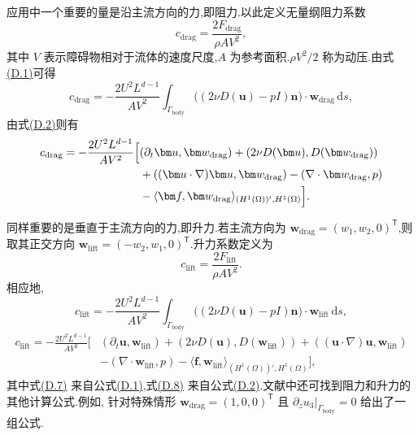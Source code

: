 \begin{note}[流动作用于物体的力]
应用中一个重要的量是沿主流方向的力,即阻力.以此定义无量纲阻力系数
\begin{equation}\label{eq:appendix-d-3}
 c_{\mathrm{drag}}=\frac{2F_{\mathrm{drag}}}{\rho A V^2},
\end{equation}
其中 $V$ 表示障碍物相对于流体的速度尺度,$A$ 为参考面积.$\rho V^2/2$ 称为动压.由式\hyperref[eq:appendix-d-1]{(D.1)}可得
\begin{equation}\label{eq:appendix-d-4}
c_{\mathrm{drag}}
=-\frac{2U^2L^{d-1}}{AV^2}
\int_{\Gamma_{\mathrm{body}}}
\bigl((2\nu D(\bm u)-pI)\bm n\bigr)\cdot\bm w_{\mathrm{drag}}\,\mathrm ds,
\end{equation}
由式\hyperref[eq:appendix-d-2]{(D.2)}则有
\begin{equation}\label{eq:appendix-d-5}
\begin{aligned}
c_{\mathrm{drag}}=-\frac{2U^2L^{d-1}}{AV^2}\Bigl[&
(\partial_t\bm u,\bm w_{\mathrm{drag}})
+(2\nu D(\bm u),D(\bm w_{\mathrm{drag}}))\\
&+((\bm u\cdot\nabla)\bm u,\bm w_{\mathrm{drag}})
-(\nabla\cdot\bm w_{\mathrm{drag}},p)\\
&-\langle\bm f,\bm w_{\mathrm{drag}}\rangle_{(H^1(\Omega))',H^1(\Omega)}
\Bigr].
\end{aligned}
\end{equation}

同样重要的是垂直于主流方向的力,即升力.若主流方向为
$\bm w_{\mathrm{drag}}=(w_1,w_2,0)^\mathsf T$,则取其正交方向
$\bm w_{\mathrm{lift}}=(-w_2,w_1,0)^\mathsf T$.升力系数定义为
\begin{equation}\label{eq:appendix-d-6}
 c_{\mathrm{lift}}=\frac{2F_{\mathrm{lift}}}{\rho A V^2}.
\end{equation}
相应地,
\begin{equation}\label{eq:appendix-d-7}
c_{\mathrm{lift}}
=-\frac{2U^2L^{d-1}}{AV^2}
\int_{\Gamma_{\mathrm{body}}}
\bigl((2\nu D(\bm u)-pI)\bm n\bigr)\cdot\bm w_{\mathrm{lift}}\,\mathrm ds,
\end{equation}
\begin{equation}\label{eq:appendix-d-8}
\begin{aligned}
c_{\mathrm{lift}}=-\frac{2U^2L^{d-1}}{AV^2}\bigl[
 &(\partial_t\bm u,\bm w_{\mathrm{lift}})
 +(2\nu D(\bm u),D(\bm w_{\mathrm{lift}}))
 +((\bm u\cdot\nabla)\bm u,\bm w_{\mathrm{lift}})\\
 &-(\nabla\cdot\bm w_{\mathrm{lift}},p)
 -\langle\bm f,\bm w_{\mathrm{lift}}\rangle_{(H^1(\Omega))',H^1(\Omega)}
\bigr],
\end{aligned}
\end{equation}
其中式\hyperref[eq:appendix-d-7]{(D.7)} 来自公式\hyperref[eq:appendix-d-1]{(D.1)},式\hyperref[eq:appendix-d-8]{(D.8)} 来自公式\hyperref[eq:appendix-d-2]{(D.2)}.文献中还可找到阻力和升力的其他计算公式.例如,\textcite{SchaeferTurek1996} 针对特殊情形 $\bm w_{\mathrm{drag}}=(1,0,0)^\mathsf T$ 且 $\partial_z u_3|_{\Gamma_{\mathrm{body}}}=0$ 给出了一组公式.
\end{note}

